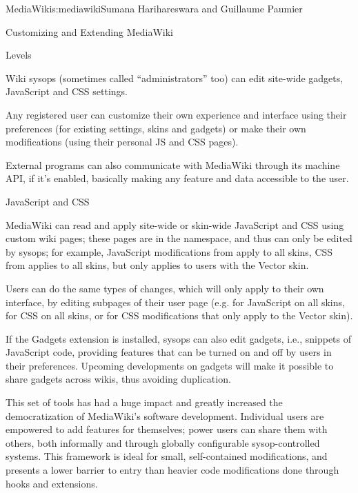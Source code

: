 \begin{aosachapter}{MediaWiki}{s:mediawiki}{Sumana Harihareswara and Guillaume Paumier}
\begin{aosasect1}{Customizing and Extending MediaWiki}
\begin{aosasect2}{Levels}
\begin{aosaitemize}
\item Wiki sysops (sometimes called ``administrators'' too) can edit
  site-wide gadgets, JavaScript and CSS settings.

\item Any registered user can customize their own experience and
  interface using their preferences (for existing settings, skins and
  gadgets) or make their own modifications (using their personal JS
  and CSS pages).

\end{aosaitemize}

External programs can also communicate with MediaWiki through its
machine API, if it's enabled, basically making any feature and data
accessible to the user.

\end{aosasect2}

\begin{aosasect2}{JavaScript and CSS}

MediaWiki can read and apply site-wide or skin-wide JavaScript and CSS
using custom wiki pages; these pages are in the 
namespace, and thus can only be edited by sysops; for example,
JavaScript modifications from  apply to all
skins, CSS from  applies to all skins, but
 only applies to users with the Vector
skin.

Users can do the same types of changes, which will only apply to their
own interface, by editing subpages of their user page
(e.g.  for
JavaScript on all skins,
 for CSS on
all skins, or 
for CSS modifications that only apply to the Vector skin).

If the Gadgets extension is installed, sysops can also edit gadgets,
i.e., snippets of JavaScript code, providing features that can be turned
on and off by users in their preferences. Upcoming developments on
gadgets will make it possible to share gadgets across wikis, thus
avoiding duplication.

This set of tools has had a huge impact and greatly increased the
democratization of MediaWiki's software development. Individual users
are empowered to add features for themselves; power users can share
them with others, both informally and through globally configurable
sysop-controlled systems. This framework is ideal for small,
self-contained modifications, and presents a lower barrier to entry
than heavier code modifications done through hooks and extensions.


\end{aosasect2}
\end{aosasect1}
\end{aosachapter}
